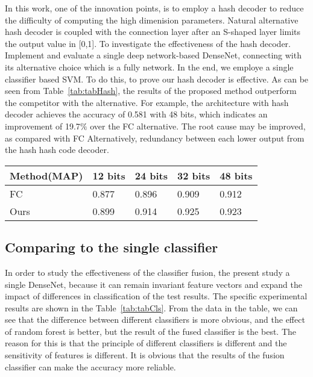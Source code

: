 In this work, one of the innovation points, is 
to employ a hash decoder to reduce the 
difficulty of computing the high dimenision 
parameters. 
Natural alternative hash decoder is coupled 
with the connection layer after an S-shaped 
layer limits the output value in [0,1].
To investigate the effectiveness of the hash 
decoder. 
Implement and evaluate a single deep 
network-based DenseNet, connecting with its 
alternative choice which is a fully network. 
In the end,
we employe a single classifier based SVM. To
do this, to prove our hash decoder is 
effective. As can be seen from 
Table~\ref{tab:tabHash}, 
the results of the proposed method outperform 
the competitor with the alternative. For 
example, the architecture with hash decoder 
achieves the accuracy of 0.581 with 48 bits, which 
indicates an improvement of 19.7$\%$ over the 
FC alternative. 
The root cause may be improved, as compared 
with FC Alternatively, redundancy between each 
lower output from the hash hash code decoder.

\begin{table*}[!ht]
    \caption{Comparison results of the hash 
        decoder and fully connection}
    \label{tab:tabHash}
    \setlength{\arrayrulewidth}{1.05 pt}
    \renewcommand{\arraystretch}{1.1}
    \begin{tabular*}{1.0\textwidth}{
        @{
            \extracolsep{\fill}
        }lllll
    }
        \hline
        
        Method(MAP) & 12 bits & 24 bits & 32 bits & 48 bits \\
                
        \hline

        FC    & 0.877 & 0.896 & 0.909 & 0.912 \\       
        Ours  & 0.899 & 0.914 & 0.925 & 0.923 \\
        
        \hline
    \end{tabular*}
\end{table*}

\subsection{Comparing to the single classifier}
\label{ExpCls}

In order to study the effectiveness of the 
classifier fusion, the present study a single 
DenseNet, because it can remain invariant 
feature vectors and expand the impact of 
differences in classification of the test 
results.
The specific experimental results are shown in 
the Table~\ref{tab:tabCls}. 
From the data in the 
table, we can see that the difference between 
different classifiers is more obvious, and 
the effect of random forest is better, but 
the result of the fused classifier is the best. 
The reason for this is that the principle of 
different classifiers is different and the 
sensitivity of features is different. It is 
obvious that the results of the fusion 
classifier can make the accuracy more reliable.

